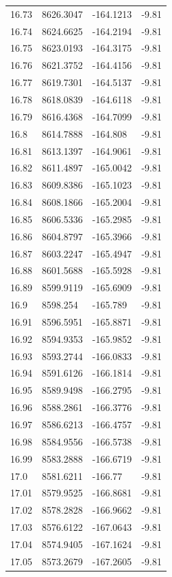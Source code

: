\begin{table}[H]
\begin{tabular}{llll}
16.73 & 8626.3047 & -164.1213 & -9.81 \\
16.74 & 8624.6625 & -164.2194 & -9.81 \\
16.75 & 8623.0193 & -164.3175 & -9.81 \\
16.76 & 8621.3752 & -164.4156 & -9.81 \\
16.77 & 8619.7301 & -164.5137 & -9.81 \\
16.78 & 8618.0839 & -164.6118 & -9.81 \\
16.79 & 8616.4368 & -164.7099 & -9.81 \\
16.8 & 8614.7888 & -164.808 & -9.81 \\
16.81 & 8613.1397 & -164.9061 & -9.81 \\
16.82 & 8611.4897 & -165.0042 & -9.81 \\
16.83 & 8609.8386 & -165.1023 & -9.81 \\
16.84 & 8608.1866 & -165.2004 & -9.81 \\
16.85 & 8606.5336 & -165.2985 & -9.81 \\
16.86 & 8604.8797 & -165.3966 & -9.81 \\
16.87 & 8603.2247 & -165.4947 & -9.81 \\
16.88 & 8601.5688 & -165.5928 & -9.81 \\
16.89 & 8599.9119 & -165.6909 & -9.81 \\
16.9 & 8598.254 & -165.789 & -9.81 \\
16.91 & 8596.5951 & -165.8871 & -9.81 \\
16.92 & 8594.9353 & -165.9852 & -9.81 \\
16.93 & 8593.2744 & -166.0833 & -9.81 \\
16.94 & 8591.6126 & -166.1814 & -9.81 \\
16.95 & 8589.9498 & -166.2795 & -9.81 \\
16.96 & 8588.2861 & -166.3776 & -9.81 \\
16.97 & 8586.6213 & -166.4757 & -9.81 \\
16.98 & 8584.9556 & -166.5738 & -9.81 \\
16.99 & 8583.2888 & -166.6719 & -9.81 \\
17.0 & 8581.6211 & -166.77 & -9.81 \\
17.01 & 8579.9525 & -166.8681 & -9.81 \\
17.02 & 8578.2828 & -166.9662 & -9.81 \\
17.03 & 8576.6122 & -167.0643 & -9.81 \\
17.04 & 8574.9405 & -167.1624 & -9.81 \\
17.05 & 8573.2679 & -167.2605 & -9.81 \\

\end{tabular}
\end{table}
